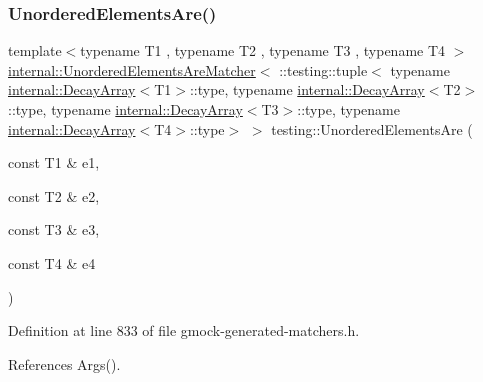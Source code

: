 \subsubsection{\texorpdfstring{Unordered\+Elements\+Are()}{UnorderedElementsAre()}\hspace{0.1cm}{\footnotesize\ttfamily [5/11]}}
{\footnotesize\ttfamily template$<$typename T1 , typename T2 , typename T3 , typename T4 $>$ \\
\hyperlink{classtesting_1_1internal_1_1UnorderedElementsAreMatcher}{internal\+::\+Unordered\+Elements\+Are\+Matcher}$<$ \+::testing\+::tuple$<$ typename \hyperlink{structtesting_1_1internal_1_1DecayArray}{internal\+::\+Decay\+Array}$<$T1$>$\+::type, typename \hyperlink{structtesting_1_1internal_1_1DecayArray}{internal\+::\+Decay\+Array}$<$T2$>$\+::type, typename \hyperlink{structtesting_1_1internal_1_1DecayArray}{internal\+::\+Decay\+Array}$<$T3$>$\+::type, typename \hyperlink{structtesting_1_1internal_1_1DecayArray}{internal\+::\+Decay\+Array}$<$T4$>$\+::type$>$ $>$ testing\+::\+Unordered\+Elements\+Are (\begin{DoxyParamCaption}\item[{const T1 \&}]{e1,  }\item[{const T2 \&}]{e2,  }\item[{const T3 \&}]{e3,  }\item[{const T4 \&}]{e4 }\end{DoxyParamCaption})\hspace{0.3cm}{\ttfamily [inline]}}



Definition at line 833 of file gmock-\/generated-\/matchers.\+h.



References Args().


